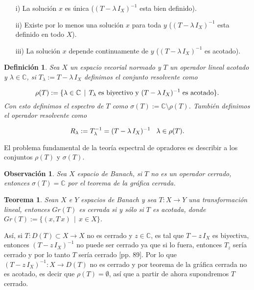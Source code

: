 \documentclass[letterpaper]{report}
\newtheorem{teorema}{Teorema}[chapter]
\newtheorem{obs}{Observaci\'on}
\newtheorem{def.}{Definici\'on}[chapter]
\newcommand{\co}{\ensuremath{\mathbb C }}
\begin{document}
\begin{enumerate}
\item[i)]La solución $x$ es única ($(T-\lambda\,I_X)^{-1}$ esta bien definido).\\

\item[ii)] Existe por lo menos una solución $x$ para toda $y$ ($(T-\lambda\,I_X)^{-1}$ esta definido en todo $X$).\\

\item[iii)] La solución $x$ depende continuamente de $y$ ($(T-\lambda\,I_X)^{-1}$ es acotado).\\
\end{enumerate}

\begin{def.}
Sea $X$ un espacio vecorial normado y $T$ un operador lineal acotado y $\lambda\in\co$, si $T_{\lambda}:=T-\lambda\,I_X$ definimos el conjunto resolvente como

\begin{equation}
\rho(T):=\lbrace\lambda\in\co\,\mid\,
				T_{\lambda}\hspace{0.1cm}\text{es biyectivo y }(T-\lambda\,I_X)^{-1}\hspace{0.1cm}\text{es acotado}
		  \rbrace.
\end{equation} 
Con esto definimos el espectro de $T$ como $\sigma(T):=\co\setminus\rho(T)$. También definimos el operador resolvente como 

$$R_{\lambda}:=T_{\lambda}^{-1}=(T-\lambda\,I_X)^{-1}\hspace*{0.3cm}\lambda\in\rho(T).$$
\end{def.}

\noindent El problema fundamental de la teoría espectral de opradores es describir a los conjuntos $\rho(T)$ y $\sigma(T)$.

\begin{obs}
Sea $X$ espacio de Banach, si $T$ no es un operador cerrado, entonces $\sigma(T)=\co$ por el teorema de la gráfica cerrada.
\end{obs}

\begin{teorema} 
Sean $X$ e $Y$ espacios de Banach y sea $T:X\rightarrow Y$ una transformación lineal, entonces $Gr(T)$ es cerrada si y sólo si $T$ es acotada, donde $Gr(T):=\lbrace(x,T\,x)\,\mid\,x\in X\rbrace$.
\end{teorema}

\noindent Así, si $T:D(T)\subset X\rightarrow X$ no es cerrado y $z\in\co$, es tal que $T-z\,I_X$ es biyectiva, entonces $(T-z\,I_X)^{-1}$ no puede ser cerrado ya que si lo fuera, entonces $T_z$ sería cerrado y por lo tanto $T$ sería cerrado \cite{weidmann1}[pp. 89]. Por lo que $(T-z\,I_X)^{-1}:X\rightarrow D(T)$ no es cerrado y por teorema de la gráfica cerrada no es acotado, es decir que $\rho(T)=\emptyset$, así que a partir de ahora supondremos $T$ cerrado. 
\end{document}
